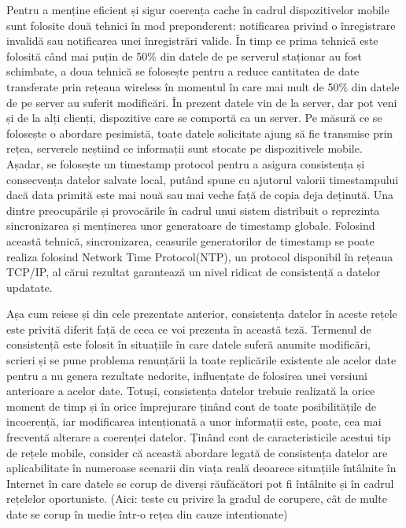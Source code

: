 \documentclass[12pt,a4paper]{report}
\begin{document}
Pentru a menține eficient și sigur coerența cache\cite{knaesel2009high} în cadrul dispozitivelor mobile sunt folosite două tehnici în mod preponderent: notificarea privind o înregistrare invalidă sau notificarea unei înregistrări valide. În timp ce prima tehnică este folosită când mai puțin de 50\% din datele de pe serverul staționar au fost schimbate, a doua tehnică se folosește pentru a reduce cantitatea de date transferate prin rețeaua wireless în momentul în care mai mult de 50\% din datele de pe server au suferit modificări. În prezent datele vin de la server, dar pot veni și de la alți clienți, dispozitive care se comportă ca un server. Pe măsură ce se folosește o abordare pesimistă, toate datele solicitate ajung să fie transmise prin rețea, serverele neștiind ce informații sunt stocate pe dispozitivele mobile. Așadar, se folosește un timestamp protocol pentru a asigura consistența și consecvența datelor salvate local, putând spune cu ajutorul valorii timestampului dacă data primită este mai nouă sau mai veche față de copia deja deținută. Una dintre preocupările și provocările în cadrul unui sistem distribuit o reprezinta sincronizarea și menținerea unor generatoare de timestamp globale. Folosind această tehnică, sincronizarea, ceasurile generatorilor de timestamp se poate realiza folosind Network Time Protocol(NTP), un protocol disponibil în rețeaua TCP/IP, al cărui rezultat garantează un nivel ridicat de consistență a datelor updatate.

Așa cum reiese și din cele prezentate anterior, consistența datelor în aceste rețele este privită diferit față de ceea ce voi prezenta în această teză. Termenul de consistență este folosit în situațiile în care datele suferă anumite modificări, scrieri și se pune problema renunțării la toate replicările existente ale acelor date pentru a nu genera rezultate nedorite, influențate de folosirea unei versiuni anterioare a acelor date. Totuși, consistența datelor trebuie realizată la orice moment de timp și în orice împrejurare ținând cont de toate posibilitățile de incoerență, iar modificarea intenționată a unor informații este, poate, cea mai frecventă alterare a coerenței datelor. Ținând cont de caracteristicile acestui tip de rețele mobile, consider că această abordare legată de consistența datelor are aplicabilitate în numeroase scenarii din viața reală deoarece situațiile întâlnite în Internet în care datele se corup de diverși răufăcători pot fi întâlnite și în cadrul rețelelor oportuniste. (Aici: teste cu privire la gradul de corupere, cât de multe date se corup în medie într-o rețea din cauze intentionate)  
\end{document}
